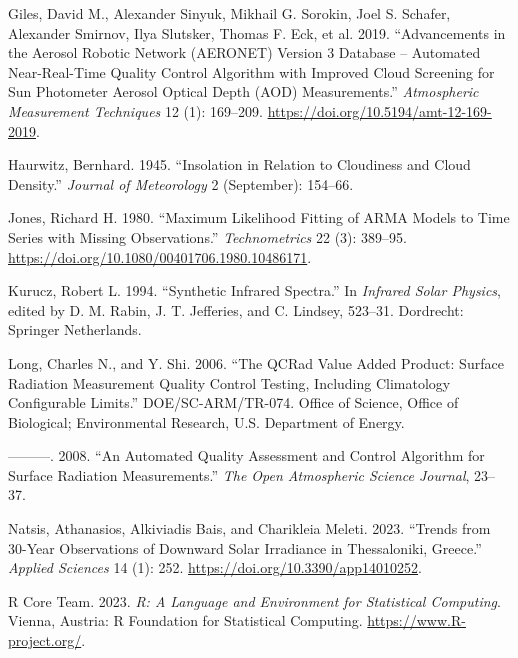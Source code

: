 \documentclass[
]{article}
\newlength{\cslhangindent}
\newlength{\cslentryspacingunit} %
\newenvironment{CSLReferences}[2] %
 {%
  \setlength{\parindent}{0pt}
  \ifodd #1
  \let\oldpar\par
  \def\par{\hangindent=\cslhangindent\oldpar}
  \fi
  \setlength{\parskip}{#2\cslentryspacingunit}
 }%
 {}
\begin{document}
\begin{CSLReferences}{1}{0}
\leavevmode{}%
Giles, David M., Alexander Sinyuk, Mikhail G. Sorokin, Joel S. Schafer, Alexander Smirnov, Ilya Slutsker, Thomas F. Eck, et al. 2019. {``Advancements in the Aerosol Robotic Network ({AERONET}) Version 3 Database -- Automated Near-Real-Time Quality Control Algorithm with Improved Cloud Screening for Sun Photometer Aerosol Optical Depth ({AOD}) Measurements.''} \emph{Atmospheric Measurement Techniques} 12 (1): 169--209. \url{https://doi.org/10.5194/amt-12-169-2019}.

\leavevmode{}%
Haurwitz, Bernhard. 1945. {``Insolation in {Relation} to {Cloudiness} and {Cloud} {Density}.''} \emph{Journal of Meteorology} 2 (September): 154--66.

\leavevmode{}%
Jones, Richard H. 1980. {``Maximum Likelihood Fitting of {ARMA} Models to Time Series with Missing Observations.''} \emph{Technometrics} 22 (3): 389--95. \url{https://doi.org/10.1080/00401706.1980.10486171}.

\leavevmode{}%
Kurucz, Robert L. 1994. {``Synthetic Infrared Spectra.''} In \emph{Infrared Solar Physics}, edited by D. M. Rabin, J. T. Jefferies, and C. Lindsey, 523--31. Dordrecht: Springer Netherlands.

\leavevmode{}%
Long, Charles N., and Y. Shi. 2006. {``The QCRad Value Added Product: Surface Radiation Measurement Quality Control Testing, Including Climatology Configurable Limits.''} DOE/SC-ARM/TR-074. Office of Science, Office of Biological; Environmental Research, U.S. Department of Energy.

\leavevmode{}%
---------. 2008. {``An Automated Quality Assessment and Control Algorithm for Surface Radiation Measurements.''} \emph{The Open Atmospheric Science Journal}, 23--37.

\leavevmode{}%
Natsis, Athanasios, Alkiviadis Bais, and Charikleia Meleti. 2023. {``Trends from 30-Year Observations of Downward Solar Irradiance in Thessaloniki, Greece.''} \emph{Applied Sciences} 14 (1): 252. \url{https://doi.org/10.3390/app14010252}.

\leavevmode{}%
R Core Team. 2023. \emph{R: A Language and Environment for Statistical Computing}. Vienna, Austria: R Foundation for Statistical Computing. \url{https://www.R-project.org/}.


\end{CSLReferences}
\end{document}
